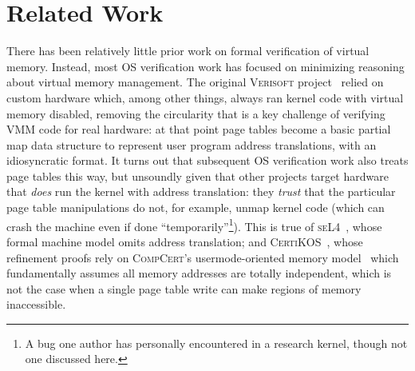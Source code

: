 \section{Related Work}
\label{sec:relwork}

There has been relatively little prior work on formal verification of virtual memory.
Instead, most OS verification work has focused on minimizing reasoning about virtual memory management.
The original \textsc{Verisoft} project~\cite{alkassar2008verisoft,alkassar2010pervasive,alkassar2008formal,dalinger2005verification,hillebrand2005address,alkassar2008formal,starostin2010formal} 
relied on custom hardware which, among other things, always ran kernel code with virtual memory disabled, removing the circularity that is a key challenge of verifying 
VMM code for real hardware: at that point page tables become a basic partial map data structure to represent user program address translations,
with an idiosyncratic format. It turns out that subsequent OS verification work also treats page tables this way, but
unsoundly given that other projects target hardware that \emph{does} run the kernel with address translation: they \emph{trust}
that the particular page table manipulations do not, for example, unmap kernel code (which can crash the machine even if done ``temporarily''\footnote{A bug
one author has personally encountered in a research kernel, though not one discussed here.}).
This is true of \textsc{seL4}~\cite{Klein2009seL4,seL4TOCS,Sewell2013translation}, whose formal machine model omits address translation;
and \textsc{CertiKOS}~\cite{gu15,gu2016certikos,gu2018certikos,chen2016interrupts}, whose refinement proofs rely on
\textsc{CompCert}'s usermode-oriented memory model~\cite{leroy2008formal,leroy2009formally} which fundamentally assumes
all memory addresses are totally independent, which is not the case when a single page table write can make regions of memory inaccessible.

